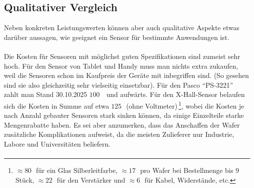 \documentclass[12pt, a4paper]{article}
\begin{document}
\subsection{Qualitativer Vergleich}	
Neben konkreten Leistungswerten können aber auch qualitative Aspekte etwas darüber aussagen, wie geeignet ein Sensor für bestimmte Anwendungen ist.\paragraph{}
Die Kosten für Sensoren mit möglichst guten Spezifikationen sind zumeist sehr hoch.\newline
Für den Sensor von Tablet und Handy muss man nichts extra zukaufen, weil die Sensoren schon im Kaufpreis der Geräte mit inbegriffen sind. (So gesehen sind sie also gleichzeitig sehr vielseitig einsetzbar). Für den Pasco ``PS-3221'' zahlt man Stand 30.10.2025 $100\,$\texteuro~ und aufwärts.\newline 
Für den X-Hall-Sensor belaufen sich die Kosten in Summe auf etwa $125\,$\texteuro ~(ohne Voltmeter)\,\footnote{$\approx80\,$\texteuro ~für ein Glas Silberleitfarbe, $\approx17\,$\texteuro ~pro Wafer bei Bestellmenge bis 9 Stück, $\approx22\,$\texteuro  ~für den Verstärker und $\approx6\,$\texteuro ~für Kabel, Widerstände, etc.}, wobei die Kosten je nach Anzahl gebauter Sensoren stark sinken können, da einige Einzelteile starke Mengenrabatte haben.\newline
Es sei aber anzumerken, dass das Anschaffen der Wafer zusätzliche Komplikationen aufweist, da die meisten Zulieferer nur Industrie, Labore und Universitäten beliefern.\paragraph{}
\end{document}

